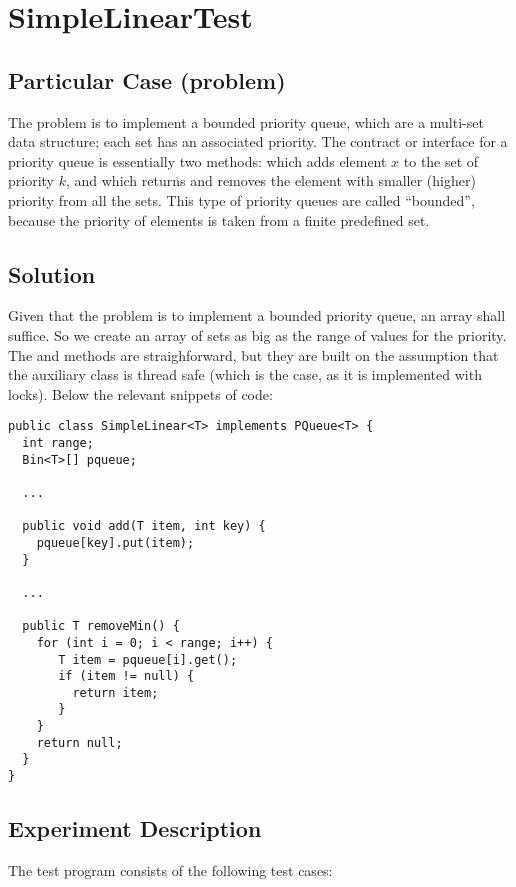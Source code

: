 \section{\textbf{SimpleLinearTest}}

\subsection{Particular Case (problem)}
The problem is to implement a bounded priority queue, which are a
multi-set data structure; each set has an associated priority. The
contract or interface for a priority queue is essentially two methods:
 which adds element $x$ to the set of priority $k$, and
   which returns and removes the element with smaller
  (higher) priority from all the sets. This type of priority queues
  are called ``bounded'', because the priority of elements is taken from
  a finite predefined set. 

\subsection{Solution}
Given that the problem is to implement a bounded priority queue, an
array shall suffice. So we create an array of sets as big as the range
of values for the priority. The  and  methods are
straighforward, but they are built on the assumption that the
auxiliary class  is thread safe (which is the case, as it is
implemented with locks). Below the relevant snippets of code: \\

\begin{lstlisting}[style=numbers]
public class SimpleLinear<T> implements PQueue<T> { 
  int range;
  Bin<T>[] pqueue; 

  ...
  
  public void add(T item, int key) {
    pqueue[key].put(item);
  }

  ... 
  
  public T removeMin() {
    for (int i = 0; i < range; i++) { 
       T item = pqueue[i].get();
       if (item != null) {
         return item;
       }
    }
    return null; 
  }
}
\end{lstlisting}
\hfill

\subsection{Experiment Description}
The test program consists of the following test cases: \\

